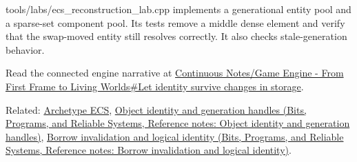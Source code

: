 tools/labs/ecs\_reconstruction\_lab.cpp implements a generational entity pool and a sparse-set component pool. Its tests remove a middle dense element and verify that the swap-moved entity still resolves correctly. It also checks stale-generation behavior.

Read the connected engine narrative at \hyperref[05-engine-i-ch014-let-identity-survive-changes-in-storage]{Continuous Notes/Game Engine - From First Frame to Living Worlds\#Let identity survive changes in storage}.

Related: \hyperref[appendix-fbfeb0430008]{Archetype ECS}, \href{../01-Bits-Programs-and-Reliable-Systems/main.pdf\#nameddest=appendix-f1581457d322}{Object identity and generation handles (Bits, Programs, and Reliable Systems, Reference notes: Object identity and generation handles)}, \href{../01-Bits-Programs-and-Reliable-Systems/main.pdf\#nameddest=appendix-f9b8b9188c7f}{Borrow invalidation and logical identity (Bits, Programs, and Reliable Systems, Reference notes: Borrow invalidation and logical identity)}.
